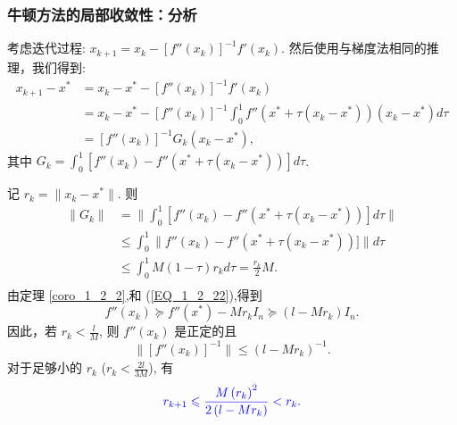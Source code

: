 \documentclass[handout,10pt]{beamer} %
\begin{document}
\begin{frame}[allowframebreaks]
\frametitle{牛顿方法的局部收敛性：分析}
考虑迭代过程: $x_{k+1}^{} = x_k - [f''(x_k)]_{}^{-1}f'(x_k)$.
然后使用与梯度法相同的推理，我们得到:
$$
\begin{aligned}
    x_{k+1}-x^*     &  =  x_k - x^* - [f''(x_k)]_{}^{-1} f'(x_k) \\
            &    = x_k - x^* - [f''(x_k)]_{}^{-1} \int_0^1 f''(x^* + \tau(x_k-x^*))(x_k-x^*) d\tau \\
            & = [f''(x_k)]_{}^{-1} G_k (x_k - x^*),
\end{aligned}
$$
其中 $G_k = \int_0^1 [f''(x_k) - f''(x^* +\tau (x_k-x^*))]d\tau$.

记 $r_k = \|x_k - x^*\|$. 则
$$
\begin{aligned}
    \|G_k\| &  = \| \int_0^1 [f''(x_k) - f''(x^* +\tau (x_k-x^*))]d\tau \| \\
            &  \leq   \int_0^1 \| f''(x_k) - f''(x^* +\tau (x_k-x^*))] \| d\tau  \\
            & \leq \int_0^1 M(1-\tau) r_k d\tau  = \frac{r_k}{2}M. \\
\end{aligned}
$$
由定理 \ref{coro_1_2_2},和 (\ref{EQ_1_2_22}),得到
$$
    f''(x_k) \succeq f''(x^*) - Mr_k I_n \succeq (l-Mr_k) I_n.
$$
因此，若 $r_k < \frac{l}{M}$, 则 $f''(x_k)$ 是正定的且
$$
    \| [f''(x_k)]_{}^{-1}\| \leq (l - M r_k )_{}^{-1}.
$$
对于足够小的 $r_k$  ($r_k < \frac{2l}{3M}$), 有
$$
   {\color{blue} r_{k+1} \leqslant \frac{M\left(r_k\right)^2}{2\left(l-M r_k\right)}<r_k.}
$$



\end{frame}
\end{document}
